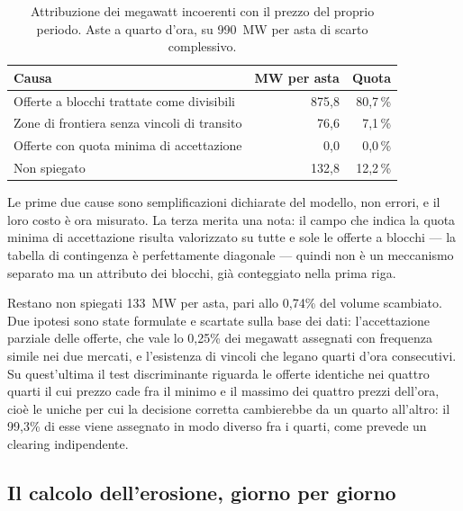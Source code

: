 \begin{table}[H]
\centering
\caption{Attribuzione dei megawatt incoerenti con il prezzo del proprio periodo.
         Aste a quarto d'ora, su 990~MW per asta di scarto complessivo.}
\label{tab:residuo}
\begin{tabular}{@{}lrr@{}}
\toprule
\textbf{Causa} & \textbf{MW per asta} & \textbf{Quota} \\
\midrule
Offerte a blocchi trattate come divisibili        & 875{,}8 & 80{,}7\,\% \\
Zone di frontiera senza vincoli di transito       &  76{,}6 &  7{,}1\,\% \\
Offerte con quota minima di accettazione          &   0{,}0 &  0{,}0\,\% \\
Non spiegato                                      & 132{,}8 & 12{,}2\,\% \\
\bottomrule
\end{tabular}
\end{table}

Le prime due cause sono semplificazioni dichiarate del modello, non errori, e il loro costo
\`e ora misurato. La terza merita una nota: il campo che indica la quota minima di
accettazione risulta valorizzato su tutte e sole le offerte a blocchi — la tabella di
contingenza \`e perfettamente diagonale — quindi non \`e un meccanismo separato ma un
attributo dei blocchi, gi\`a conteggiato nella prima riga.

Restano non spiegati 133~MW per asta, pari allo 0{,}74\% del volume scambiato. Due ipotesi
sono state formulate e scartate sulla base dei dati: l'accettazione parziale delle offerte,
che vale lo 0{,}25\% dei megawatt assegnati con frequenza simile nei due mercati, e
l'esistenza di vincoli che legano quarti d'ora consecutivi. Su quest'ultima il test
discriminante riguarda le offerte identiche nei quattro quarti il cui prezzo cade fra il
minimo e il massimo dei quattro prezzi dell'ora, cio\`e le uniche per cui la decisione
corretta cambierebbe da un quarto all'altro: il 99{,}3\% di esse viene assegnato in modo
diverso fra i quarti, come prevede un clearing indipendente.


\subsection{Il calcolo dell'erosione, giorno per giorno}
\label{sec:calcolo-erosione}

